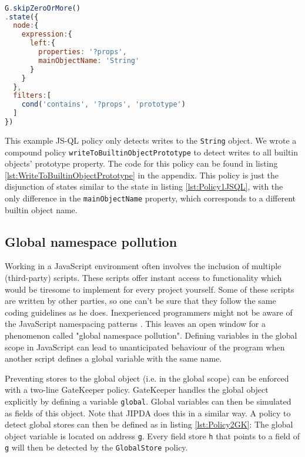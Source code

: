 \begin{lstlisting}[label={lst:Policy1JSQL},language=JavaScript,caption=Policy 1 in JS-QL,mathescape=true]  % float=t?

G.skipZeroOrMore()
.state({
  node:{
    expression:{
      left:{
        properties: '?props',
        mainObjectName: 'String'
      }
    }
  },
  filters:[
    cond('contains', '?props', 'prototype')
  ]
})

\end{lstlisting}

This example JS-QL policy only detects writes to the \texttt{String} object. We wrote a compound policy \texttt{writeToBuiltinObjectPrototype} to detect writes to all builtin objects' prototype property. The code for this policy can be found in listing \ref{lst:WriteToBuiltinObjectPrototype} in the appendix. This policy is just the disjunction of states similar to the state in listing \ref{lst:Policy1JSQL}, with the only difference in the \texttt{mainObjectName} property, which corresponds to a different builtin object name.

\subsection{Global namespace pollution}

Working in a JavaScript environment often involves the inclusion of multiple (third-party) scripts. These scripts offer instant access to functionality which would be tiresome to implement for every project yourself. Some of these scripts are written by other parties, so one can't be sure that they follow the same coding guidelines as he does. Inexperienced programmers might not be aware of the JavaScript namespacing patterns \cite{JSNamespacing}. This leaves an open window for a phenomenon called "global namespace pollution". Defining variables in the global scope in JavaScript can lead to unanticipated behaviour of the program when another script defines a global variable with the same name.

Preventing stores to the global object (i.e. in the global scope) can be enforced with a two-line GateKeeper policy. GateKeeper handles the global object explicitly by defining a variable \texttt{global}. Global variables can then be simulated as fields of this object. Note that JIPDA does this in a similar way. A policy to detect global stores can then be defined as in listing \ref{lst:Policy2GK}: The global object variable is located on address \texttt{g}. Every field store \texttt{h} that points to a field of \texttt{g} will then be detected by the \texttt{GlobalStore} policy.

